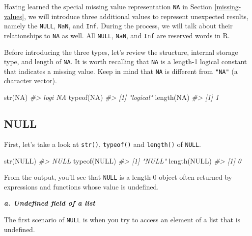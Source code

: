 \documentclass[
]{book}
\newenvironment{Shaded}{\begin{snugshade}}{\end{snugshade}}
\newcommand{\CommentTok}[1]{\textcolor[rgb]{0.56,0.35,0.01}{\textit{#1}}}
\newcommand{\ConstantTok}[1]{\textcolor[rgb]{0.00,0.00,0.00}{#1}}
\newcommand{\FunctionTok}[1]{\textcolor[rgb]{0.00,0.00,0.00}{#1}}
\newcommand{\NormalTok}[1]{#1}
\begin{document}
Having learned the special missing value representation \texttt{NA} in Section \ref{missing-values}, we will introduce three additional values to represent unexpected results, namely the \texttt{NULL}, \texttt{NaN}, and \texttt{Inf}. During the process, we will talk about their relationships to \texttt{NA} as well. All \texttt{NULL}, \texttt{NaN}, and \texttt{Inf} are reserved words in R.

Before introducing the three types, let's review the structure, internal storage type, and length of \texttt{NA}. It is worth recalling that \texttt{NA} is a length-1 logical constant that indicates a missing value. Keep in mind that \texttt{NA} is different from \texttt{"NA"} (a character vector).

\begin{Shaded}
\begin{Highlighting}[]
\FunctionTok{str}\NormalTok{(}\ConstantTok{NA}\NormalTok{)}
\CommentTok{\#\textgreater{}  logi NA}
\FunctionTok{typeof}\NormalTok{(}\ConstantTok{NA}\NormalTok{)}
\CommentTok{\#\textgreater{} [1] "logical"}
\FunctionTok{length}\NormalTok{(}\ConstantTok{NA}\NormalTok{)}
\CommentTok{\#\textgreater{} [1] 1}
\end{Highlighting}
\end{Shaded}

\hypertarget{null-1}{%
\subsection{NULL}\label{null-1}}

First, let's take a look at \texttt{str()}, \texttt{typeof()} and \texttt{length()} of \texttt{NULL}.

\begin{Shaded}
\begin{Highlighting}[]
\FunctionTok{str}\NormalTok{(}\ConstantTok{NULL}\NormalTok{)}
\CommentTok{\#\textgreater{}  NULL}
\FunctionTok{typeof}\NormalTok{(}\ConstantTok{NULL}\NormalTok{)}
\CommentTok{\#\textgreater{} [1] "NULL"}
\FunctionTok{length}\NormalTok{(}\ConstantTok{NULL}\NormalTok{)}
\CommentTok{\#\textgreater{} [1] 0}
\end{Highlighting}
\end{Shaded}

From the output, you'll see that \texttt{NULL} is a length-0 object often returned by expressions and functions whose value is undefined.

\textbf{\emph{a. Undefined field of a list}}

The first scenario of \texttt{NULL} is when you try to access an element of a list that is undefined.
\end{document}
